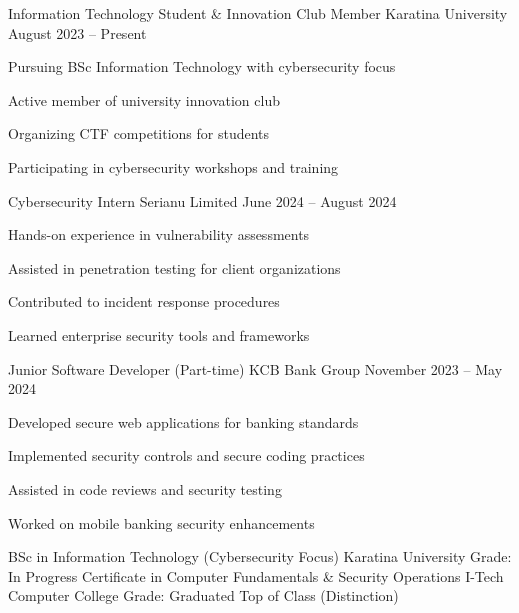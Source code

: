 \documentclass[]{resume-format}
\begin{document}
\begin{cventries}
    \cventry
    { Information Technology Student \& Innovation Club Member }
    { Karatina University }
    {}
    { August 2023 – Present }
    {\begin{cvitems}
        \item { Pursuing BSc Information Technology with cybersecurity focus }
        \item { Active member of university innovation club }
        \item { Organizing CTF competitions for students }
        \item { Participating in cybersecurity workshops and training }
    \end{cvitems}}
    \cventry
    { Cybersecurity Intern }
    { Serianu Limited }
    {}
    { June 2024 – August 2024 }
    {\begin{cvitems}
        \item { Hands-on experience in vulnerability assessments }
        \item { Assisted in penetration testing for client organizations }
        \item { Contributed to incident response procedures }
        \item { Learned enterprise security tools and frameworks }
    \end{cvitems}}
    \cventry
    { Junior Software Developer (Part-time) }
    { KCB Bank Group }
    {}
    { November 2023 – May 2024 }
    {\begin{cvitems}
        \item { Developed secure web applications for banking standards }
        \item { Implemented security controls and secure coding practices }
        \item { Assisted in code reviews and security testing }
        \item { Worked on mobile banking security enhancements }
    \end{cvitems}}
\end{cventries}




\begin{cventries}
    \cventry
    { BSc in Information Technology (Cybersecurity Focus) }
    { Karatina University }
    {}
    {}
    {Grade: In Progress}
    \cventry
    { Certificate in Computer Fundamentals \& Security Operations }
    { I-Tech Computer College }
    {}
    {}
    {Grade: Graduated Top of Class (Distinction)}
\end{cventries}
\end{document}
